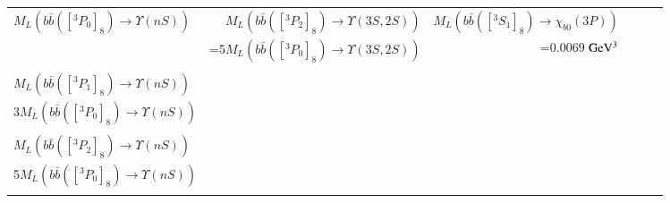 \documentclass[review]{elsarticle}
\begin{document}
\begin{table}
\begin{tabular*}{\textwidth}{@{\extracolsep{\fill}}lrrrrl@{}}
    $M_L(b\bar{b}([^3P_0]_8)\rightarrow\Upsilon(nS))$ & $M_L(b\bar{b}([^3P_2]_8)\rightarrow\Upsilon(3S,2S))$ &$M_L(b\bar{b}([^3S_1]_8)\rightarrow\chi_{b0}(3P))$ \\
    & =5$M_L(b\bar{b}([^3P_0]_8)\rightarrow\Upsilon(3S,2S))$ &=0.0069 ${\rm GeV^3}$ \\ \\
    
    $M_L(b\bar{b}([^3P_1]_8)\rightarrow\Upsilon(nS))$ & & \\
    3$M_L(b\bar{b}([^3P_0]_8)\rightarrow\Upsilon(nS))$ & &  \\ \\
    
    $M_L(b\bar{b}([^3P_2]_8)\rightarrow\Upsilon(nS))$ & & \\
    5$M_L(b\bar{b}([^3P_0]_8)\rightarrow\Upsilon(nS))$ & &  \\ \\
    \hline
    \hline
  \end{tabular*}
  \label{CSCO}
\end{table}
\normalsize
\end{document}

